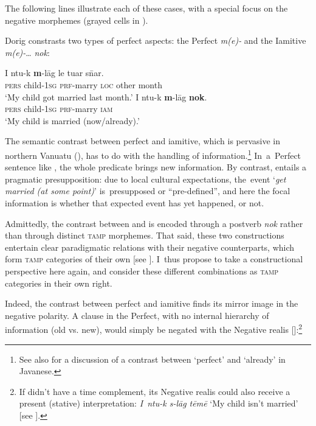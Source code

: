 \documentclass[output=paper,colorlinks,citecolor=brown,draft]{langscibook}
\begin{document}
\noindent The following lines illustrate each of these cases, with a special focus on the negative morphemes (grayed cells in ).

Dorig constrasts two types of perfect aspects: the Perfect \textit{m(e)-} and the Iamitive \textit{m(e)-}… \textit{nok}:

\ea\label{ex:dor:married} 
    \ea\label{ex:dor:married1}
        \gll  I ntu-k \textbf{m}-lāg le tuar s\={n}ar.\\ 
              \textsc{pers} child-\textsc{1sg} \textsc{prf}-marry \textsc{loc} other month\\
        \glt ‘My child got married last month.’
    \ex\label{ex:dor:married2} 
        \gll  I ntu-k \textbf{m}-lāg \textbf{nok}.\\ 
              \textsc{pers} child-\textsc{1sg} \textsc{prf}-marry \textsc{iam}\\
        \glt ‘My child is married (now/already).’
    \z
\z 

The semantic contrast between perfect and iamitive, which is pervasive in northern Vanuatu (\citealt[118–130]{François2003}), has to do with the handling of information.\footnote{See also \citet{KlokMatthewson2015} \textsf{f}or a discussion of a contrast between ‘perfect’ and ‘already’ in Javanese\textsf{.}} In~a~Perfect sentence like , the whole predicate brings new information. By contrast,  entails a pragmatic presupposition: due to local cultural expectations, the~event ‘\textit{get married (at some point)}’ is~presupposed or “pre-defined”, and here the focal information is whether that expected event has yet happened, or not. 

Admittedly, the contrast between  and  is encoded through a postverb \textit{nok} rather than through distinct \textsc{tamp} morphemes. That said, these two constructions entertain clear paradigmatic relations with their negative counterparts, which form \textsc{tamp} categories of their own [see ]. I~thus propose to take a constructional perspective here again, and consider these different combinations as \textsc{tamp} categories in their own right.

Indeed, the contrast between perfect and iamitive finds its mirror image in the negative polarity. A clause in the Perfect, with no internal hierarchy of information (old vs. new), would simply be negated with the Negative realis []:\footnote{If  didn’t have a time complement, its Negative realis could also receive a present (stative) interpretation: \textit{I~ntu-k s-lāg tēmē} ‘My child isn’t married’ [see ].}
\end{document}
